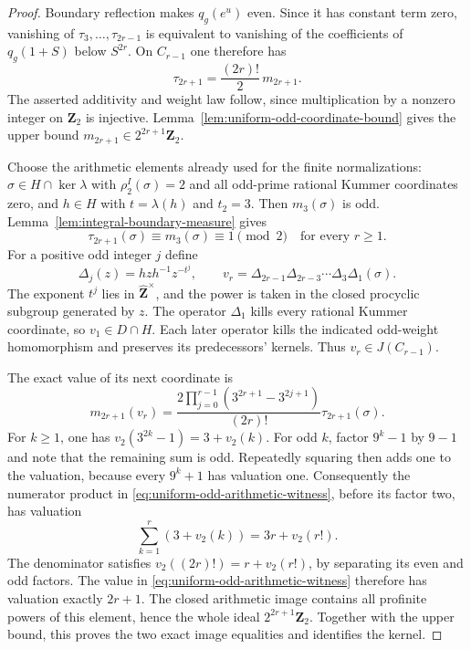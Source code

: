 \begin{proof}
Boundary reflection makes $q_g(e^u)$ even. Since it has constant
term zero, vanishing of $\tau_3,\ldots,\tau_{2r-1}$ is equivalent
to vanishing of the coefficients of $q_g(1+S)$ below $S^{2r}$.
On $C_{r-1}$ one therefore has
\[
 \tau_{2r+1}=\frac{(2r)!}{2}\,m_{2r+1}.
\]
The asserted additivity and weight law follow, since multiplication
by a nonzero integer on $\mathbf Z_2$ is injective.
Lemma~\ref{lem:uniform-odd-coordinate-bound} gives the upper bound
$m_{2r+1}\in2^{2r+1}\mathbf Z_2$.

Choose the arithmetic elements already used for the finite
normalizations: $\sigma\in H\cap\ker\lambda$ with
$\rho_2^I(\sigma)=2$ and all odd-prime rational Kummer coordinates
zero, and $h\in H$ with $t=\lambda(h)$ and $t_2=3$.
Then $m_3(\sigma)$ is odd. Lemma~\ref{lem:integral-boundary-measure}
gives
\[
 \tau_{2r+1}(\sigma)\equiv m_3(\sigma)\equiv1\pmod2
 \quad\text{for every }r\ge1.
\]
For a positive odd integer $j$ define
\[
 \Delta_j(z)=hzh^{-1}z^{-t^j},\qquad
 v_r=\Delta_{2r-1}\Delta_{2r-3}\cdots\Delta_3\Delta_1(\sigma).
\]
The exponent $t^j$ lies in $\widehat{\mathbf Z}^{\times}$, and the
power is taken in the closed procyclic subgroup generated by $z$.
The operator $\Delta_1$ kills every rational Kummer coordinate,
so $v_1\in D\cap H$. Each later operator kills the indicated
odd-weight homomorphism and preserves its predecessors' kernels.
Thus $v_r\in J(C_{r-1})$.

The exact value of its next coordinate is
\begin{equation}\label{eq:uniform-odd-arithmetic-witness}
 m_{2r+1}(v_r)=
 \frac{2\prod_{j=0}^{r-1}(3^{2r+1}-3^{2j+1})}{(2r)!}
                         \tau_{2r+1}(\sigma).
\end{equation}
For $k\ge1$, one has
$v_2(3^{2k}-1)=3+v_2(k)$.
For odd $k$, factor $9^k-1$ by $9-1$ and note that the remaining
sum is odd. Repeatedly squaring then adds one to the valuation,
because every $9^k+1$ has valuation one. Consequently the numerator
product in \eqref{eq:uniform-odd-arithmetic-witness}, before its
factor two, has valuation
\[
 \sum_{k=1}^{r}(3+v_2(k))=3r+v_2(r!).
\]
The denominator satisfies
$v_2((2r)!)=r+v_2(r!)$, by separating its even and odd factors.
The value in \eqref{eq:uniform-odd-arithmetic-witness} therefore has
valuation exactly $2r+1$. The closed arithmetic image contains all
profinite powers of this element, hence the whole ideal
$2^{2r+1}\mathbf Z_2$. Together with the upper bound, this proves
the two exact image equalities and identifies the kernel.


\end{proof}
